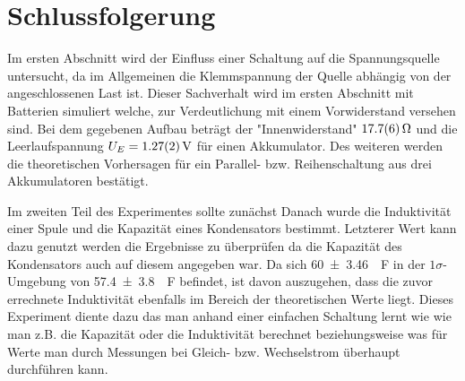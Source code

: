 
\section{Schlussfolgerung}


Im ersten Abschnitt wird der Einfluss einer Schaltung auf die Spannungsquelle untersucht, da im Allgemeinen die Klemmspannung der Quelle abhängig von der angeschlossenen Last ist. Dieser Sachverhalt wird im ersten Abschnitt mit Batterien simuliert welche, zur Verdeutlichung mit einem Vorwiderstand versehen sind. Bei dem gegebenen Aufbau beträgt der "Innenwiderstand" $\SI{17.7+-0.6}{\ohm}$ und die Leerlaufspannung $U_E=\SI{1.27+-0.02}{V}$ für einen Akkumulator. Des weiteren werden die theoretischen Vorhersagen für ein Parallel- bzw. Reihenschaltung aus drei Akkumulatoren bestätigt.

Im zweiten Teil des Experimentes sollte zunächst %
Danach wurde die Induktivität einer Spule und die Kapazität eines Kondensators bestimmt.
Letzterer Wert kann dazu genutzt werden die Ergebnisse zu überprüfen da die Kapazität des Kondensators auch auf diesem angegeben war.
Da sich \SI{60+-3.46}{\mu F} in der $1\sigma$-Umgebung von \SI{57.4+-3.8}{\mu F} befindet, ist davon auszugehen, dass die zuvor errechnete Induktivität ebenfalls im Bereich der theoretischen Werte liegt.
Dieses Experiment diente dazu das man anhand einer einfachen Schaltung lernt wie wie man z.B. die Kapazität oder die Induktivität berechnet beziehungsweise was für Werte man durch Messungen bei Gleich- bzw. Wechselstrom überhaupt durchführen kann.










